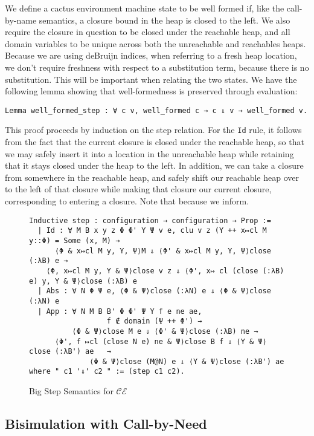 We define a cactus environment machine state to be well formed if, like the
call-by-name semantics, a closure bound in the heap is closed to the left.
We also require the closure in question to be closed under the reachable heap,
and all domain variables to be unique across both the unreachable and reachables
heaps. Because we are using deBruijn indices, when referring to a fresh heap
location, we don't require freshness with respect to a substitution term,
because there is no substitution. This will be important when relating the two
states. We have the following lemma showing that well-formedness is preserved
through evaluation: 

\begin{lstlisting}
Lemma well_formed_step : ∀ c v, well_formed c → c ⇓ v → well_formed v.
\end{lstlisting}

This proof proceeds by induction on the step relation. For the \texttt{Id} rule,
it follows from the fact that the current closure is closed under the reachable
heap, so that we may safely insert it into a location in the unreachable heap
while retaining that it stays closed under the heap to the left. In addition, we
can take a closure from somewhere in the reachable heap, and safely shift our
reachable heap over to the left of that closure while making that closure our
current closure, corresponding to entering a closure. Note that because we
inform.     

\begin{figure}
\begin{lstlisting}
Inductive step : configuration → configuration → Prop :=
  | Id : ∀ M B x y z Φ Φ' Υ Ψ v e, clu v z (Υ ++ x↦cl M y::Φ) = Some (x, M) → 
      ⟨Φ & x↦cl M y, Υ, Ψ⟩M ⇓ ⟨Φ' & x↦cl M y, Υ, Ψ⟩close (:λB) e →
    ⟨Φ, x↦cl M y, Υ & Ψ⟩close v z ⇓ ⟨Φ', x↦ cl (close (:λB) e) y, Υ & Ψ⟩close (:λB) e
  | Abs : ∀ N Φ Ψ e, ⟨Φ & Ψ⟩close (:λN) e ⇓ ⟨Φ & Ψ⟩close (:λN) e
  | App : ∀ N M B B' Φ Φ' Ψ Υ f e ne ae, 
                  f ∉ domain (Ψ ++ Φ') → 
          ⟨Φ & Ψ⟩close M e ⇓ ⟨Φ' & Ψ⟩close (:λB) ne → 
      ⟨Φ', f ↦cl (close N e) ne & Ψ⟩close B f ⇓ ⟨Υ & Ψ⟩close (:λB') ae   →
              ⟨Φ & Ψ⟩close (M@N) e ⇓ ⟨Υ & Ψ⟩close (:λB') ae
where " c1 '⇓' c2 " := (step c1 c2).
\end{lstlisting}
\caption{Big Step Semantics for $\mathcal{CE}$}
\label{fig:bigstepcem}
\end{figure}

\subsection{Bisimulation with Call-by-Need}

